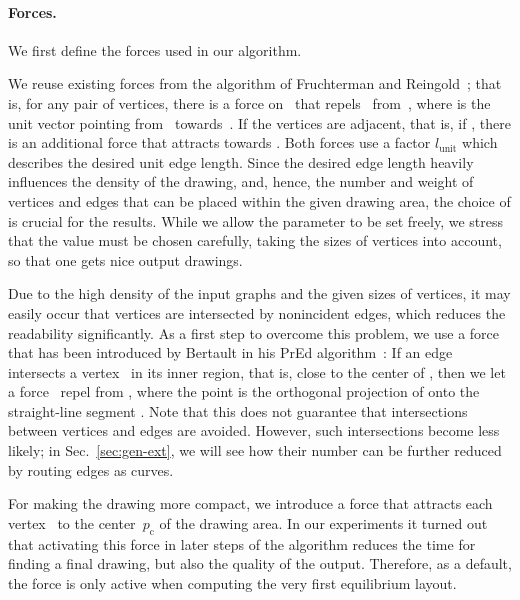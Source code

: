 \documentclass[]{llncs}
\newcommand{\pcenter}{\ensuremath{p_\mathrm{c}}\xspace}
\newcommand{\lunit}{\ensuremath{l_\mathrm{unit}}\xspace}
\begin{document}
\paragraph{Forces.}
\label{sec:gen-forces}
We first define the forces used in our algorithm.
\begin{compactitem}
  \item We reuse existing forces from the algorithm of Fruchterman and
    Reingold~\cite{Fruchterman1991}; that is, for any pair  of
    vertices, there is a force  on~
		that repels~ from~, where  is the unit
		vector pointing from~ towards~. If the vertices are
    adjacent, that is, if , there is an additional force
		 that attracts  towards .
		Both forces use a factor \lunit which describes the
		desired unit edge length. Since the desired edge length heavily
		influences the density of the drawing, and, hence, the number
		and weight of vertices and edges that can be placed within the
		given drawing area, the choice of  is crucial
		for the results. While we allow the parameter to be set freely,
		we stress that the value must be chosen carefully, taking the
		sizes of vertices into account, so that one gets nice output
		drawings.
  \item Due to the high density of the input graphs and the given
    sizes of vertices, it may easily occur that vertices are
    intersected by nonincident edges, which reduces the readability
    significantly. As a first step to overcome this problem, we use a
    force that has been introduced by Bertault in his PrEd
    algorithm~\cite{Bertault2000}: If an edge~
    intersects a vertex~ in its inner region, that is, close to the
    center of , then we let a
    force~ repel  from , where the point  is the orthogonal projection of
		 onto the straight-line segment . Note that this does not guarantee
		that intersections between vertices and edges are avoided.
		However, such intersections become less likely; in
		Sec.~\ref{sec:gen-ext}, we will see how their number
		can be further reduced by routing edges as curves.
  \item For making the drawing more compact, we introduce a force
     that attracts each
		vertex~ to the center~\pcenter of the drawing area.
In our experiments it turned out that activating this force in
		later steps of the algorithm reduces the time for finding a final
		drawing, but also the quality of the output. Therefore, as a
		default, the force is only active when computing the very first
		equilibrium layout.
\end{compactitem}
\end{document}
